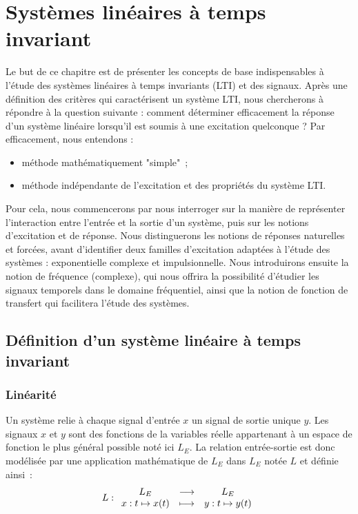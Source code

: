 \chapter{Systèmes linéaires à temps invariant}
\label{chap:lti}
	Le but de ce chapitre est de présenter les concepts de base indispensables à l'étude des systèmes linéaires à temps invariants (LTI) et des signaux.
	Après une définition des critères qui caractérisent un système LTI, nous chercherons à répondre à la question suivante :
	comment déterminer efficacement la réponse d'un système linéaire lorsqu'il est soumis à une excitation quelconque ? Par efficacement, nous entendons :
	\begin{itemize}
		\item méthode mathématiquement "simple"~;
		\item méthode indépendante de l'excitation et des propriétés du système LTI.
	\end{itemize}
	
	
	Pour cela, nous commencerons par nous interroger sur la manière de représenter l'interaction entre l'entrée et la sortie d'un système, puis sur les notions d'excitation et de réponse. Nous distinguerons les notions de réponses naturelles et forcées, avant d'identifier deux familles d'excitation adaptées à l'étude des systèmes : exponentielle complexe et impulsionnelle. Nous introduirons ensuite la notion de fréquence (complexe), qui nous offrira la possibilité d'étudier les signaux temporels dans le domaine fréquentiel, ainsi que la notion de fonction de transfert qui facilitera l'étude des systèmes.
	
	
	\section{Définition d'un système linéaire à temps invariant}

	\subsection{Linéarité} 
	Un système relie à chaque signal d'entrée $x$ un signal de sortie unique $y$. Les signaux $x$ et $y$ sont des fonctions de la variables réelle appartenant à un espace de fonction le plus général possible noté ici $L_E$. La relation entrée-sortie est donc modélisée par une application mathématique de $L_E$ dans $L_E$ notée $L$ et définie ainsi~:
	\begin{equation}
		L : \begin{array}{ccc} L_E & \longrightarrow & L_E \\ x : t\mapsto x(t) & \longmapsto & y : t\mapsto y(t) \\ \end{array} 
	\end{equation}

